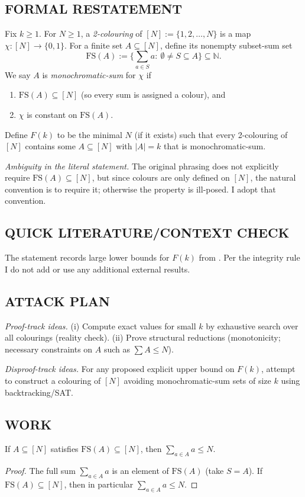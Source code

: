 \subsection*{FORMAL RESTATEMENT}
Fix $k\ge 1$. For $N\ge 1$, a \emph{2-colouring} of $[N]:=\{1,2,\dots,N\}$ is a map $\chi:[N]\to\{0,1\}$. For a finite set $A\subseteq [N]$, define its nonempty subset-sum set
\[
\mathrm{FS}(A):=\Big\{\sum_{a\in S}a:\ \emptyset\ne S\subseteq A\Big\}\subseteq \mathbb N.
\]
We say $A$ is \emph{monochromatic-sum} for $\chi$ if
\begin{enumerate}
\item $\mathrm{FS}(A)\subseteq [N]$ (so every sum is assigned a colour), and
\item $\chi$ is constant on $\mathrm{FS}(A)$.
\end{enumerate}
Define $F(k)$ to be the minimal $N$ (if it exists) such that every 2-colouring of $[N]$ contains some $A\subseteq [N]$ with $|A|=k$ that is monochromatic-sum.

\emph{Ambiguity in the literal statement.} The original phrasing does not explicitly require $\mathrm{FS}(A)\subseteq [N]$, but since colours are only defined on $[N]$, the natural convention is to require it; otherwise the property is ill-posed. I adopt that convention.

\subsection*{QUICK LITERATURE/CONTEXT CHECK}
The statement records large lower bounds for $F(k)$ from \cite{ErSp89,BENTW17}. Per the integrity rule I do not add or use any additional external results.

\subsection*{ATTACK PLAN}
\emph{Proof-track ideas.} (i) Compute exact values for small $k$ by exhaustive search over all colourings (reality check). (ii) Prove structural reductions (monotonicity; necessary constraints on $A$ such as $\sum A\le N$).

\emph{Disproof-track ideas.} For any proposed explicit upper bound on $F(k)$, attempt to construct a colouring of $[N]$ avoiding monochromatic-sum sets of size $k$ using backtracking/SAT.

\subsection*{WORK}
\begin{lemma}\label{lem:531-sum}
If $A\subseteq [N]$ satisfies $\mathrm{FS}(A)\subseteq [N]$, then $\sum_{a\in A} a \le N$.
\end{lemma}
\begin{proof}
The full sum $\sum_{a\in A}a$ is an element of $\mathrm{FS}(A)$ (take $S=A$). If $\mathrm{FS}(A)\subseteq [N]$, then in particular $\sum_{a\in A}a\le N$.
\end{proof}

